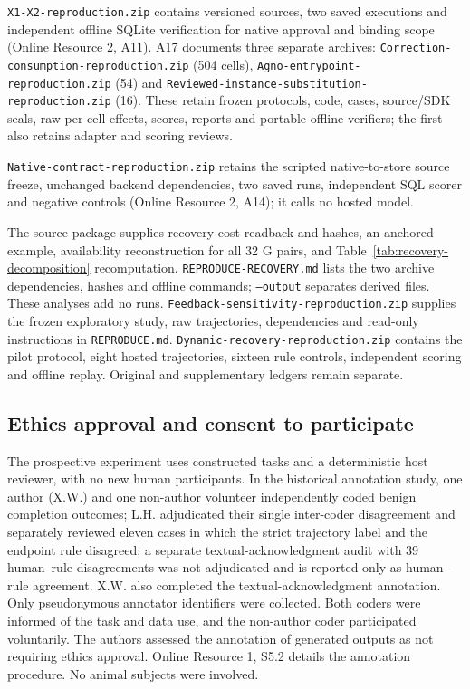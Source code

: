 \documentclass[pdflatex,sn-basic]{sn-jnl}
\begin{document}
{\nolinkurl{X1-X2-reproduction.zip}} contains versioned sources, two saved executions and independent offline SQLite verification for native approval and binding scope (Online Resource 2, A11). A17 documents three separate archives: {\nolinkurl{Correction-consumption-reproduction.zip}} (504 cells), {\nolinkurl{Agno-entrypoint-reproduction.zip}} (54) and {\nolinkurl{Reviewed-instance-substitution-reproduction.zip}} (16). These retain frozen protocols, code, cases, source/SDK seals, raw per-cell effects, scores, reports and portable offline verifiers; the first also retains adapter and scoring reviews.

{\nolinkurl{Native-contract-reproduction.zip}} retains the scripted native-to-store source freeze, unchanged backend dependencies, two saved runs, independent SQL scorer and negative controls (Online Resource 2, A14); it calls no hosted model.

The source package supplies recovery-cost readback and hashes, an anchored example, availability reconstruction for all 32 G pairs, and Table~\ref{tab:recovery-decomposition} recomputation. \texttt{REPRODUCE-RECOVERY.md} lists the two archive dependencies, hashes and offline commands; \texttt{--output} separates derived files. These analyses add no runs. {\nolinkurl{Feedback-sensitivity-reproduction.zip}} supplies the frozen exploratory study, raw trajectories, dependencies and read-only instructions in \texttt{REPRODUCE.md}. {\nolinkurl{Dynamic-recovery-reproduction.zip}} contains the pilot protocol, eight hosted trajectories, sixteen rule controls, independent scoring and offline replay. Original and supplementary ledgers remain separate.

\subsection*{Ethics approval and consent to participate}
The prospective experiment uses constructed tasks and a deterministic host reviewer, with no new human participants. In the historical annotation study, one author (X.W.) and one non-author volunteer independently coded benign completion outcomes; L.H. adjudicated their single inter-coder disagreement and separately reviewed eleven cases in which the strict trajectory label and the endpoint rule disagreed; a separate textual-acknowledgment audit with 39 human--rule disagreements was not adjudicated and is reported only as human--rule agreement. X.W. also completed the textual-acknowledgment annotation. Only pseudonymous annotator identifiers were collected. Both coders were informed of the task and data use, and the non-author coder participated voluntarily. The authors assessed the annotation of generated outputs as not requiring ethics approval. Online Resource 1, S5.2 details the annotation procedure. No animal subjects were involved.
\end{document}
